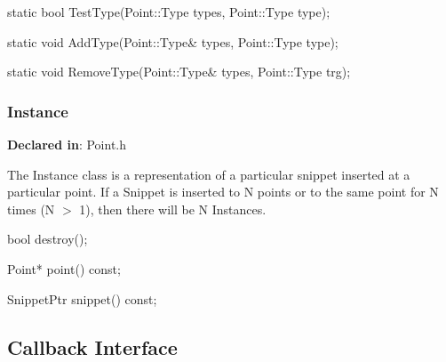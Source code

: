 \begin{apient}
static bool TestType(Point::Type types, Point::Type type);
\end{apient}



\begin{apient}
static void AddType(Point::Type& types, Point::Type type);
\end{apient}



\begin{apient}
static void RemoveType(Point::Type& types, Point::Type trg);
\end{apient}



\subsubsection{Instance}
\label{sec-3.1.3}

\textbf{Declared in}: Point.h

The Instance class is a representation of a particular snippet inserted at a
particular point. If a Snippet is inserted to N points or to the same point for
N times (N $>$ 1), then there will be N Instances.


\begin{apient}
bool destroy();
\end{apient}



\begin{apient}
Point* point() const;
\end{apient}



\begin{apient}
SnippetPtr snippet() const;
\end{apient}



\subsection{Callback Interface}
\label{sec-3.1}


